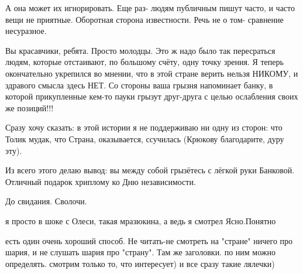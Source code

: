 \begin{itemize}
\begin{itemize}
А она может их игнорировать. Еще раз- людям публичным пишут часто, и часто вещи
не приятные. Оборотная сторона известности. Речь не о том- сравнение несуразное.

\end{itemize}

 

Вы красавчики, ребята. Просто молодцы. Это ж надо было так пересраться людям,
которые отстаивают, по большому счёту, одну точку зрения. Я теперь окончательно
укрепился во мнении, что в этой стране верить нельзя НИКОМУ, и здравого смысла
здесь НЕТ. Со стороны ваша грызня напоминает банку, в которой прикупленные
кем-то пауки грызут друг-друга с целью ослабления своих же позиций!!!

Сразу хочу сказать: в этой истории я не поддерживаю ни одну из сторон: что
Толик мудак, что Страна, оказывается, ссучилась (Крюкову благодарите, дуру
эту).

Из всего этого делаю вывод: вы между собой грызётесь с лёгкой руки Банковой.
Отличный подарок хриплому ко Дню независимости.

До свидания. Сволочи.


 
я просто в шоке с Олеси, такая мразюкина, а ведь я смотрел Ясно.Понятно

 

есть один очень хороший способ. Не читать-не смотреть на "стране" ничего про
шария, и не слушать шария про "страну". Там же заголовки. по ним можно
определять. смотрим только то, что интересует) и все сразу такие лялечки)

\begin{itemize}
 

\end{itemize}
\end{itemize}
